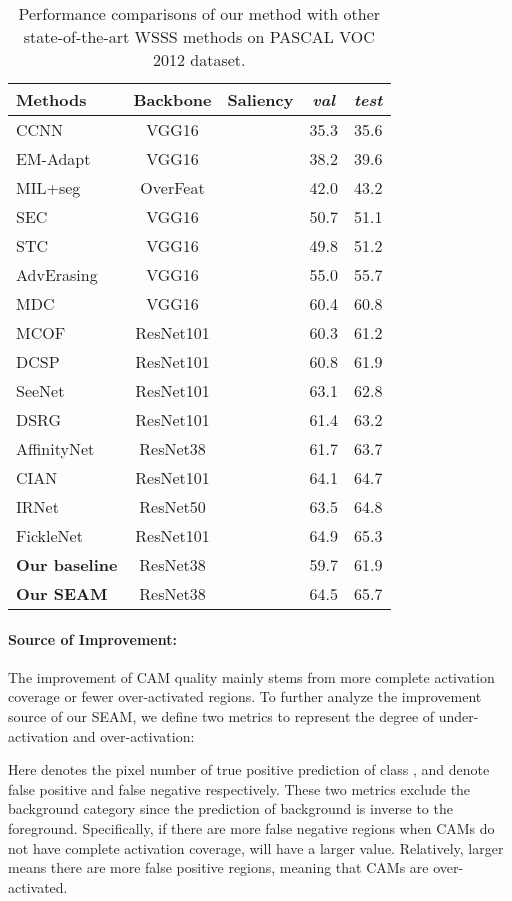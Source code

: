 \documentclass[10pt,twocolumn,letterpaper]{article}
\begin{document}
	\begin{table}[t]
		\centering
		\small
		\begin{tabular}{lcc|cc}
			\hline
			Methods & Backbone & Saliency & \textit{val} & \textit{test}\\
			\hline
			CCNN~\cite{CCNN} & VGG16 & & 35.3 & 35.6\\
			EM-Adapt~\cite{EM-Adapt} & VGG16 & & 38.2 & 39.6\\
			MIL+seg~\cite{MIL} & OverFeat & & 42.0 & 43.2\\
			SEC~\cite{SEC} & VGG16 & & 50.7 & 51.1\\
			STC~\cite{STC} & VGG16 &  &49.8 & 51.2\\
			AdvErasing~\cite{AdvErasing} & VGG16 &  & 55.0 & 55.7\\
			MDC~\cite{MDC} & VGG16 &  & 60.4 & 60.8\\
			MCOF~\cite{MCOF} & ResNet101 &   & 60.3 & 61.2\\
			DCSP~\cite{DCSP} & ResNet101 &  & 60.8 & 61.9\\
			SeeNet~\cite{SeeNet} & ResNet101 &  & 63.1 & 62.8\\
			DSRG~\cite{DSRG} & ResNet101 &  & 61.4 & 63.2\\
			AffinityNet~\cite{AffinityNet} & ResNet38 & & 61.7 & 63.7\\
			CIAN~\cite{CIAN} & ResNet101 &  & 64.1 & 64.7\\
			IRNet~\cite{IRNet} & ResNet50 & & 63.5 & 64.8\\
			FickleNet~\cite{FickleNet} & ResNet101 &  & 64.9 & 65.3\\
			\hline
			\textbf{Our baseline} & ResNet38 & & 59.7 & 61.9\\
			\textbf{Our SEAM} & ResNet38 & & 64.5 & 65.7\\
			\hline
		\end{tabular}
		\caption{Performance comparisons of our method with other state-of-the-art WSSS methods on PASCAL VOC 2012 dataset.}
		\label{tab:final}
\end{table}
\paragraph{Source of Improvement:}
	The improvement of CAM quality mainly stems from more complete activation coverage or fewer over-activated regions. To further analyze the improvement source of our SEAM, we define two metrics to represent the degree of under-activation and over-activation:
	
	
	Here  denotes the pixel number of true positive prediction of class ,  and  denote false positive and false negative respectively. These two metrics exclude the background category since the prediction of background is inverse to the foreground. Specifically, if there are more false negative regions when CAMs do not have complete activation coverage,  will have a larger value. Relatively, larger  means there are more false positive regions, meaning that CAMs are over-activated.
	
\end{document}

